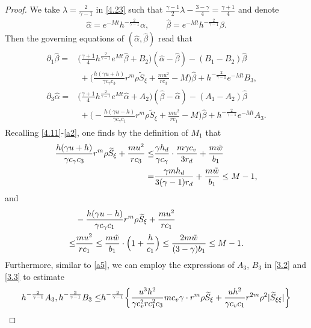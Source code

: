 \documentclass[11pt,reqno]{article}
\newcommand{\fr}{\frac}
\newcommand{\pa}{\partial}
\numberwithin{equation}{section}
\begin{document}
\begin{proof}
We take $\lambda=\fr{2}{\gamma-1}$ in \eqref{4.23} such that $\fr{\gamma-1}{2}\lambda-\fr{3-\gamma}{4}=\fr{\gamma+1}{4}$ and denote
\begin{align}\label{4.26}
\hat{\alpha}=e^{-Mt}h^{-\fr{2}{\gamma-1}}\alpha,\qquad \hat{\beta}=e^{-Mt}h^{-\fr{2}{\gamma-1}}\beta.
\end{align}
Then the governing equations of $(\hat\alpha,\hat\beta)$ read that
\begin{align}\label{4.27}
\begin{split}
\pa_1 \hat{\beta} =& \Big(\fr{\gamma+1}{4}h^{\fr{2}{\gamma-1}}e^{Mt}\hat{\beta} +B_2\Big)(\hat\alpha-\hat\beta) -(B_1-B_2)\hat\beta \\
&\ +\Big(\fr{h(\gamma u+h)}{\gamma c_\gamma c_3}r^m\rho \widetilde{S}_\xi +\fr{mu^2}{rc_3}-M\Big)\hat\beta +h^{-\fr{2}{\gamma-1}}e^{-Mt}B_3, \\
\pa_3 \hat{\alpha} =& \Big(\fr{\gamma+1}{4}h^{\fr{2}{\gamma-1}}e^{Mt}\hat{\alpha} +A_2\Big)(\hat\beta-\hat\alpha) -(A_1-A_2)\hat\beta \\
&\ +\Big(-\fr{h(\gamma u-h)}{\gamma c_\gamma c_1}r^m\rho \widetilde{S}_\xi +\fr{mu^2}{rc_1}-M\Big)\hat\beta +h^{-\fr{2}{\gamma-1}}e^{-Mt}A_3.
\end{split}
\end{align}
Recalling \eqref{4.11}-\eqref{a2}, one finds by the definition of $M_1$ that
\begin{align}\label{4.28}
\fr{h(\gamma u+h)}{\gamma c_\gamma c_3}r^m\rho \widetilde{S}_\xi +\fr{mu^2}{rc_3} \leq & \fr{\gamma h_d}{\gamma c_\gamma }\cdot\fr{m\gamma c_v}{3r_d} +\fr{m\tilde{w}}{b_1} \notag \\
=&\fr{\gamma mh_d}{3(\gamma-1)r_d}+\fr{m\tilde{w}}{b_1}\leq M-1,
\end{align}
and
\begin{align}\label{4.29}
& -\fr{h(\gamma u-h)}{\gamma c_\gamma c_1}r^m\rho \widetilde{S}_\xi +\fr{mu^2}{rc_1} \notag \\ \leq& \fr{mu^2}{rc_1}
\leq \fr{m\tilde{w}}{b_1}\cdot \Big(1+\fr{h}{c_1}\Big)\leq \fr{2m\tilde{w}}{(3-\gamma)b_1}\leq M-1.
\end{align}
Furthermore, similar to \eqref{a5}, we can employ the expressions of $A_3$, $B_3$ in \eqref{3.2} and \eqref{3.3} to estimate
\begin{align}\label{4.30}
h^{-\fr{2}{\gamma-1}}A_3, h^{-\fr{2}{\gamma-1}}B_3\leq & h^{-\fr{2}{\gamma-1}}\bigg\{\fr{u^3h^2}{\gamma c_{v}^2 r c_{1}^2 c_{3}}mc_v\gamma \cdot r^m\rho \widetilde{S}_\xi +\fr{uh^2}{\gamma c_v c_1}r^{2m}\rho^2|\widetilde{S}_{\xi\xi}|\bigg\} \notag \\

\end{align}
\end{proof}
\end{document}
